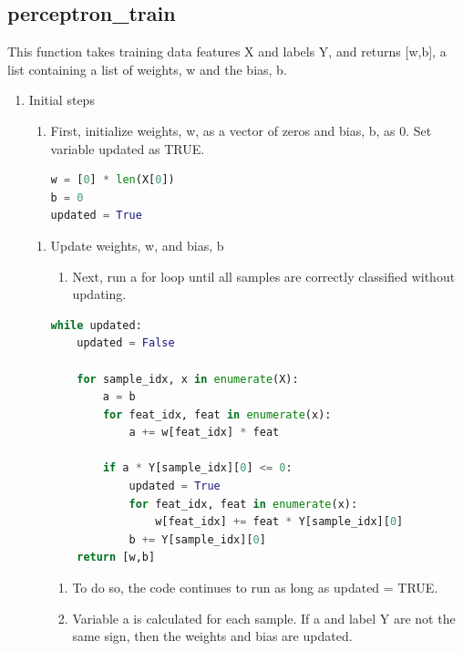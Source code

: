 \documentclass[11pt]{article}
\theoremstyle{definition}
\begin{document}
\subsection{perceptron\_train}
This function takes training data features \textsf{X} and labels \textsf{Y}, and returns \textsf{[w,b]}, a list containing a list of weights, \textsf{w} and the bias, \textsf{b}.
\begin{enumerate}
    \item Initial steps
    \begin{enumerate}
        \item First, initialize weights, \textsf{w}, as a vector of zeros and bias, \textsf{b}, as 0. Set variable \textsf{updated} as TRUE.
\begin{lstlisting}[language=python, frame=single]
w = [0] * len(X[0])
b = 0
updated = True
\end{lstlisting}
\end{enumerate}
\begin{enumerate}
    \item Update weights, \textsf{w}, and bias, \textsf{b}
    \begin{enumerate}
        \item Next, run a for loop until all samples are correctly classified without updating.
    \end{enumerate}
\begin{lstlisting}[language=python, frame=single]
while updated:
    updated = False
    
    for sample_idx, x in enumerate(X):
        a = b
        for feat_idx, feat in enumerate(x):
            a += w[feat_idx] * feat
    
        if a * Y[sample_idx][0] <= 0:
            updated = True
            for feat_idx, feat in enumerate(x):
                w[feat_idx] += feat * Y[sample_idx][0]
            b += Y[sample_idx][0]
    return [w,b]
\end{lstlisting}
        \begin{enumerate}
            \item To do so, the code continues to run as long as \textsf{updated = TRUE}.
            \item Variable \textsf{a} is calculated for each sample. If \textsf{a} and label \textsf{Y} are not the same sign, then the weights and bias are updated.
        \end{enumerate}
    \end{enumerate}
\end{enumerate}
\end{document}
